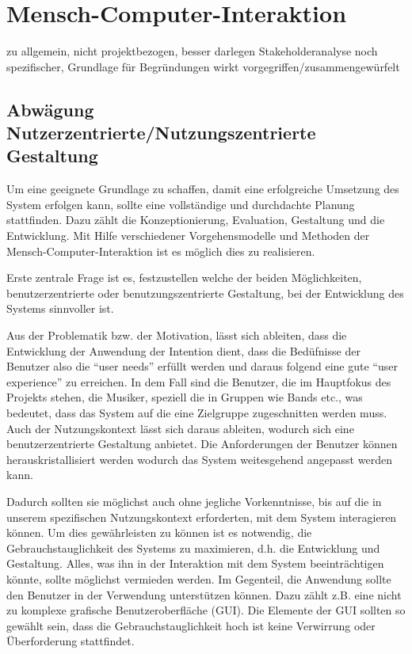 \documentclass[12pt]{scrartcl}
\begin{document}






\section{Mensch-Computer-Interaktion}

zu allgemein, nicht projektbezogen, besser darlegen
Stakeholderanalyse noch spezifischer, Grundlage für Begründungen
wirkt vorgegriffen/zusammengewürfelt

\subsection{Abwägung Nutzerzentrierte/Nutzungszentrierte Gestaltung}
Um eine geeignete Grundlage zu schaffen, damit eine erfolgreiche Umsetzung des System erfolgen kann, sollte eine vollständige und durchdachte Planung stattfinden. Dazu zählt die Konzeptionierung, Evaluation, Gestaltung und die Entwicklung. 
Mit Hilfe verschiedener Vorgehensmodelle und Methoden der Mensch-Computer-Interaktion ist es möglich dies zu realisieren.

Erste zentrale Frage ist es, festzustellen welche der beiden Möglichkeiten, benutzerzentrierte oder benutzungszentrierte Gestaltung, bei der Entwicklung des Systems sinnvoller ist.

Aus der Problematik bzw. der Motivation, lässt sich ableiten, dass die Entwicklung der Anwendung der Intention dient, dass die Bedüfnisse der Benutzer also die “user needs” erfüllt werden und daraus folgend eine gute “user experience” zu erreichen. 
In dem Fall sind die Benutzer, die im Hauptfokus des Projekts stehen, die Musiker, speziell die in Gruppen wie Bands etc., was bedeutet, dass das System auf die eine Zielgruppe zugeschnitten werden muss. Auch der Nutzungskontext lässt sich daraus ableiten, wodurch sich eine benutzerzentrierte Gestaltung anbietet. Die Anforderungen der Benutzer können herauskristallisiert werden wodurch das System weitesgehend angepasst werden kann.

Dadurch sollten sie möglichst auch ohne jegliche Vorkenntnisse, bis auf die in unserem spezifischen Nutzungskontext erforderten, mit dem System interagieren können.
Um dies gewährleisten zu können ist es notwendig, die Gebrauchstauglichkeit des Systems zu maximieren, d.h. die Entwicklung und Gestaltung. Alles, was ihn in der Interaktion mit dem System beeinträchtigen könnte, sollte möglichst vermieden werden. Im Gegenteil, die Anwendung sollte den Benutzer in der Verwendung unterstützen können. Dazu zählt z.B. eine nicht zu komplexe grafische Benutzeroberfläche (GUI). Die Elemente der GUI sollten so gewählt sein, dass die Gebrauchstauglichkeit hoch ist keine Verwirrung oder Überforderung stattfindet.
\end{document}
